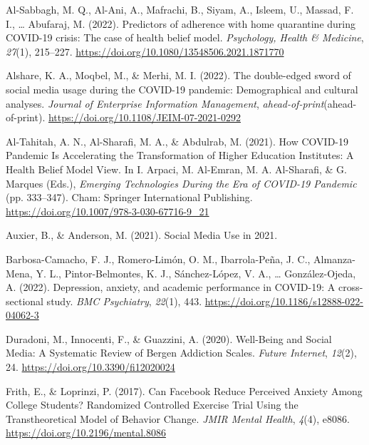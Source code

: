 \documentclass[
  man]{apa6}
\newlength{\cslhangindent}
\newlength{\cslentryspacingunit} %
\newenvironment{CSLReferences}[2] %
 {%
  \setlength{\parindent}{0pt}
  \ifodd #1
  \let\oldpar\par
  \def\par{\hangindent=\cslhangindent\oldpar}
  \fi
  \setlength{\parskip}{#2\cslentryspacingunit}
 }%
 {}
\begin{document}
\hypertarget{refs}{}
\begin{CSLReferences}{1}{0}
\leavevmode{}%
Al-Sabbagh, M. Q., Al-Ani, A., Mafrachi, B., Siyam, A., Isleem, U., Massad, F. I., \ldots{} Abufaraj, M. (2022). Predictors of adherence with home quarantine during {COVID-19} crisis: The case of health belief model. \emph{Psychology, Health \& Medicine}, \emph{27}(1), 215--227. \url{https://doi.org/10.1080/13548506.2021.1871770}

\leavevmode{}%
Alshare, K. A., Moqbel, M., \& Merhi, M. I. (2022). The double-edged sword of social media usage during the {COVID-19} pandemic: Demographical and cultural analyses. \emph{Journal of Enterprise Information Management}, \emph{ahead-of-print}(ahead-of-print). \url{https://doi.org/10.1108/JEIM-07-2021-0292}

\leavevmode{}%
Al-Tahitah, A. N., Al-Sharafi, M. A., \& Abdulrab, M. (2021). How {COVID-19 Pandemic Is Accelerating} the {Transformation} of {Higher Education Institutes}: {A Health Belief Model View}. In I. Arpaci, M. Al-Emran, M. A. Al-Sharafi, \& G. Marques (Eds.), \emph{Emerging {Technologies During} the {Era} of {COVID-19 Pandemic}} (pp. 333--347). {Cham}: {Springer International Publishing}. \url{https://doi.org/10.1007/978-3-030-67716-9_21}

\leavevmode{}%
Auxier, B., \& Anderson, M. (2021). Social {Media Use} in 2021.

\leavevmode{}%
Barbosa-Camacho, F. J., Romero-Limón, O. M., Ibarrola-Peña, J. C., Almanza-Mena, Y. L., Pintor-Belmontes, K. J., Sánchez-López, V. A., \ldots{} González-Ojeda, A. (2022). Depression, anxiety, and academic performance in {COVID-19}: A cross-sectional study. \emph{BMC Psychiatry}, \emph{22}(1), 443. \url{https://doi.org/10.1186/s12888-022-04062-3}

\leavevmode{}%
Duradoni, M., Innocenti, F., \& Guazzini, A. (2020). Well-{Being} and {Social Media}: {A Systematic Review} of {Bergen Addiction Scales}. \emph{Future Internet}, \emph{12}(2), 24. \url{https://doi.org/10.3390/fi12020024}

\leavevmode{}%
Frith, E., \& Loprinzi, P. (2017). Can {Facebook Reduce Perceived Anxiety Among College Students}? {Randomized Controlled Exercise Trial Using} the {Transtheoretical Model} of {Behavior Change}. \emph{JMIR Mental Health}, \emph{4}(4), e8086. \url{https://doi.org/10.2196/mental.8086}


\end{CSLReferences}
\end{document}
